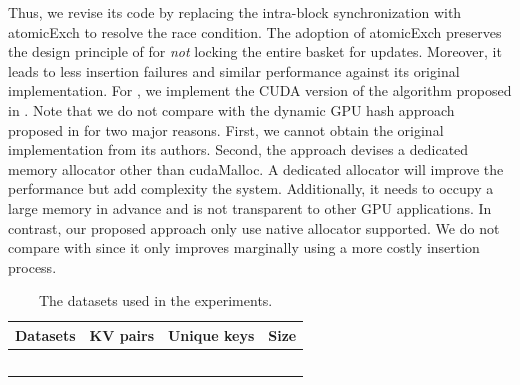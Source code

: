 Thus, we revise its code by replacing the intra-block synchronization with atomicExch to resolve the race condition. The adoption of atomicExch preserves the design principle of \megakv for \emph{not} locking the entire basket for updates. Moreover, it leads to less insertion failures and similar performance against its original implementation. 
For \linear, we implement the CUDA version of the algorithm proposed in \cite{hong2010mapcg}.
Note that we do not compare with the dynamic GPU hash approach proposed in \cite{ashkiani2018dynamic} for two major reasons. First, we cannot obtain the original implementation from its authors. Second, the approach devises a dedicated memory allocator other than cudaMalloc. A dedicated allocator will improve the performance but add complexity the system. Additionally, it needs to occupy a large memory in advance and is not transparent to other GPU applications.
In contrast, our proposed approach only use native allocator supported. 
We do not compare with \cite{breslow2016horton} since it only improves \megakv marginally using a more costly insertion process.

\begin{table}[t]
	\caption{The datasets used in the experiments.}
	\label{table:exp_data_sets}
	\centering
	\begin{tabular}{|c|c|c|c|}
		\hline
		Datasets & KV pairs & Unique keys & Size \\ \hline
		\dstwitter & & & \\ \hline
		\dsreddit & & & \\ \hline
		\dstpch & & & \\ \hline
		\dsali & & & \\ \hline
		\dsrandom & & & \\ \hline
	\end{tabular}
\end{table}

